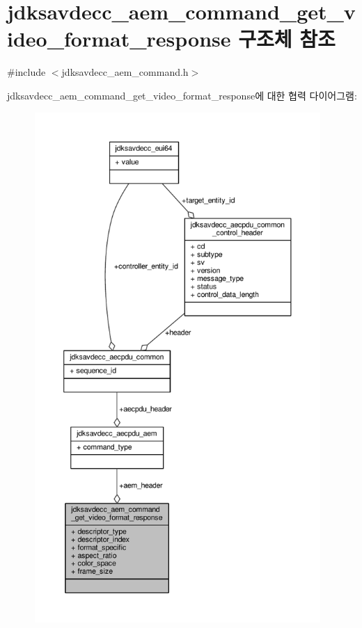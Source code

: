 \hypertarget{structjdksavdecc__aem__command__get__video__format__response}{}\section{jdksavdecc\+\_\+aem\+\_\+command\+\_\+get\+\_\+video\+\_\+format\+\_\+response 구조체 참조}
\label{structjdksavdecc__aem__command__get__video__format__response}


{\ttfamily \#include $<$jdksavdecc\+\_\+aem\+\_\+command.\+h$>$}



jdksavdecc\+\_\+aem\+\_\+command\+\_\+get\+\_\+video\+\_\+format\+\_\+response에 대한 협력 다이어그램\+:
\nopagebreak
\begin{figure}[H]
\begin{center}
\leavevmode
\includegraphics[height=550pt]{structjdksavdecc__aem__command__get__video__format__response__coll__graph}
\end{center}
\end{figure}
